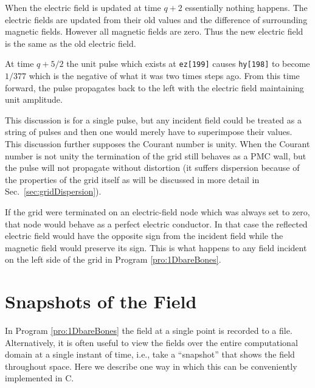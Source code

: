 When the electric field is updated at time $q+2$ essentially nothing
happens.  The electric fields are updated from their old values and
the difference of surrounding magnetic fields.  However all magnetic
fields are zero.  Thus the new electric field is the same as the old
electric field.

At time $q+5/2$ the unit pulse which exists at {\tt ez[199]} causes
{\tt hy[198]} to become $1/377$ which is the negative of what it was two
times steps ago.  From this time forward, the pulse propagates back to
the left with the electric field maintaining unit amplitude.

This discussion is for a single pulse, but any incident field could be
treated as a string of pulses and then one would merely have to
superimpose their values.  This discussion further supposes the Courant
number is unity.  When the Courant number is not unity the termination
of the grid still behaves as a PMC wall, but the pulse will not
propagate without distortion (it suffers dispersion because of the
properties of the grid itself as will be discussed in more detail in
Sec.\ \ref{sec:gridDispersion}).

If the grid were terminated on an electric-field node which was
always set to zero, that node would behave as a perfect electric
conductor.  In that case the reflected electric field would have the
opposite sign from the incident field while the magnetic field would
preserve its sign.  This is what happens to any field incident on the
left side of the grid in Program \ref{pro:1DbareBones}.

\section{Snapshots of the Field}

In Program \ref{pro:1DbareBones} the field at a single point is
recorded to a file.  Alternatively, it is often useful to view the
fields over the entire computational domain at a single instant of
time, i.e., take a ``snapshot'' that shows the field throughout space.
Here we describe one way in which this can be conveniently implemented
in C.

